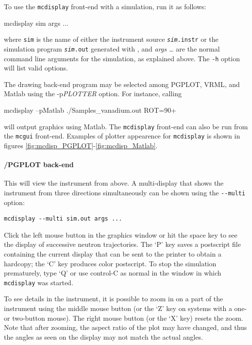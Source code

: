 To use the \verb+mcdisplay+ front-end with a simulation, run it as
follows:
\begin{bash}
mcdisplay sim args ...
\end{bash}

where \verb+sim+ is the name of either the instrument source
\texttt{\textit{sim}.instr} or the simulation program \texttt{\textit{sim}.out} generated with
\MCS, and \textit{args \ldots} are the normal command line arguments for the
simulation, as explained above. The \verb+-h+ option will list valid options.

The drawing back-end program may be selected among
PGPLOT, VRML, and Matlab using the -p\textit{PLOTTER} option. For instance, calling
\begin{bash}
mcdisplay --pMatlab ./Samples_vanadium.out ROT=90+
\end{bash}
will output graphics using Matlab.
The \verb+mcdisplay+ front-end can also be run from the \verb+mcgui+ front-end.
Examples of plotter appearence for \verb+mcdisplay+ is shown in figures
 \ref{fig:mcdisp_PGPLOT}-\ref{fig:mcdisp_Matlab}.

\paragraph{\MCS /PGPLOT back-end}

This will view the instrument from above. A multi-display that shows the
instrument from three directions simultaneously can be shown using the
\verb+--multi+ option:
\begin{lstlisting}
mcdisplay --multi sim.out args ...
\end{lstlisting}

Click the left mouse button in the graphics window or hit the space key to see
the display of successive neutron trajectories. The `P' key saves a postscript
file containing the current display that can be sent to the printer to obtain a
hardcopy; the `C' key produces color postscript.  To stop the simulation
prematurely, type `Q' or use control-C as normal in the window in which
\verb+mcdisplay+ was started.

To see details in the instrument, it is possible to zoom in on a part of the
instrument using the middle mouse button (or the `Z' key on systems with a one-
or two-button mouse). The right mouse button (or the `X' key) resets the
zoom. Note that after zooming, the aspect ratio of the plot may have changed,
and thus the angles as seen on the display may not match the actual angles.

